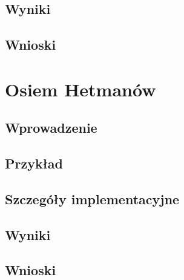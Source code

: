     \subsection{Wyniki}
    \subsection{Wnioski}
\section{Osiem Hetmanów}
    \subsection{Wprowadzenie}
    \subsection{Przykład}
    \subsection{Szczegóły implementacyjne}
    \subsection{Wyniki}
    \subsection{Wnioski}